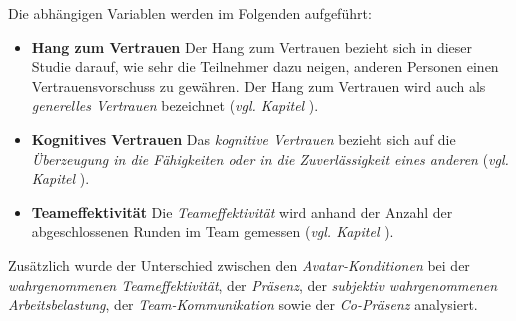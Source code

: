 \documentclass[a4paper,11pt]{article}%
\renewcommand{\\}{\vspace*{0.5\baselineskip} \newline}
\begin{document}
Die abhängigen Variablen werden im Folgenden aufgeführt:
\begin{itemize}
\item \textbf{Hang zum Vertrauen} Der Hang zum Vertrauen bezieht sich in dieser Studie darauf, wie sehr die Teilnehmer dazu neigen, anderen Personen einen Vertrauensvorschuss zu gewähren. Der Hang zum Vertrauen wird auch als \textit{generelles Vertrauen} bezeichnet \citep[S. 30]{mcallister1995affect} (\textit{vgl. Kapitel }).
\item \textbf{Kognitives Vertrauen} Das \textit{kognitive Vertrauen} bezieht sich auf die \textit{Überzeugung in die Fähigkeiten oder in die Zuverlässigkeit eines anderen} \citep[S. 30]{mcallister1995affect} (\textit{vgl. Kapitel }).
\item \textbf{Teameffektivität} Die \textit{Teameffektivität} wird anhand der Anzahl der abgeschlossenen Runden im Team gemessen (\textit{vgl. Kapitel }).
\end{itemize}

Zusätzlich wurde der Unterschied zwischen den \textit{Avatar-Konditionen} bei der \textit{wahrgenommenen Teameffektivität}, der \textit{Präsenz}, der \textit{subjektiv wahrgenommenen Arbeitsbelastung}, der \textit{Team-Kommunikation} sowie der \textit{Co-Präsenz} analysiert.
				
\end{document}
